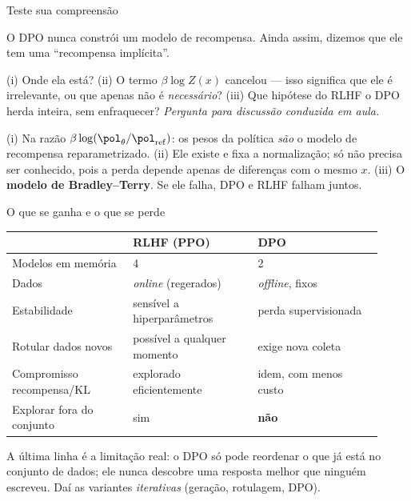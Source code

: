 \documentclass[aspectratio=169, 11pt]{beamer}
\newcommand{\paradiscussao}{\smallskip
  {\footnotesize\color{rlCinza}\itshape Pergunta para discussão conduzida em aula.}}
\newcommand{\thv}{\theta}
\newcommand{\polth}{\pol_{\thv}}                 %
\newcommand{\pref}{\pol_{\mathrm{ref}}}          %
\begin{document}
\begin{frame}{Teste sua compreensão}

  \begin{quizbox}{}
    O DPO nunca constrói um modelo de recompensa. Ainda assim, dizemos que ele
    tem uma ``recompensa implícita''.

    \smallskip
    (i) Onde ela está? (ii) O termo $\beta\log Z(x)$ cancelou --- isso significa
    que ele é irrelevante, ou que apenas não é \emph{necessário}? (iii) Que
    hipótese do RLHF o DPO herda inteira, sem enfraquecer?
    \paradiscussao
  \end{quizbox}

  \pause

  \begin{respbox}
    (i) Na razão $\beta\log(\polth/\pref)$: os pesos da política \emph{são} o
    modelo de recompensa reparametrizado. \;(ii) Ele existe e fixa a
    normalização; só não precisa ser conhecido, pois a perda depende apenas de
    diferenças com o mesmo $x$. \;(iii) O \textbf{modelo de Bradley--Terry}. Se
    ele falha, DPO e RLHF falham juntos.
  \end{respbox}
\end{frame}

\begin{frame}{O que se ganha e o que se perde}

  \begin{center}\small
  \begin{tabular}{@{}p{0.3\linewidth}p{0.31\linewidth}p{0.31\linewidth}@{}}
    \toprule
    & \textbf{RLHF (PPO)} & \textbf{DPO} \\
    \midrule
    Modelos em memória & 4 & 2 \\
    Dados & \emph{online} (regerados) & \emph{offline}, fixos \\
    Estabilidade & sensível a hiperparâmetros & perda supervisionada \\
    Rotular dados novos & possível a qualquer momento & exige nova coleta \\
    Compromisso recompensa/KL & explorado eficientemente & idem, com menos custo \\
    Explorar fora do conjunto & sim & \textbf{não} \\
    \bottomrule
  \end{tabular}
  \end{center}

  \begin{alertabox}
    A última linha é a limitação real: o DPO só pode reordenar o que já está no
    conjunto de dados; ele nunca descobre uma resposta melhor que ninguém
    escreveu. Daí as variantes \emph{iterativas} (geração, rotulagem, DPO).
  \end{alertabox}
\end{frame}
\end{document}
